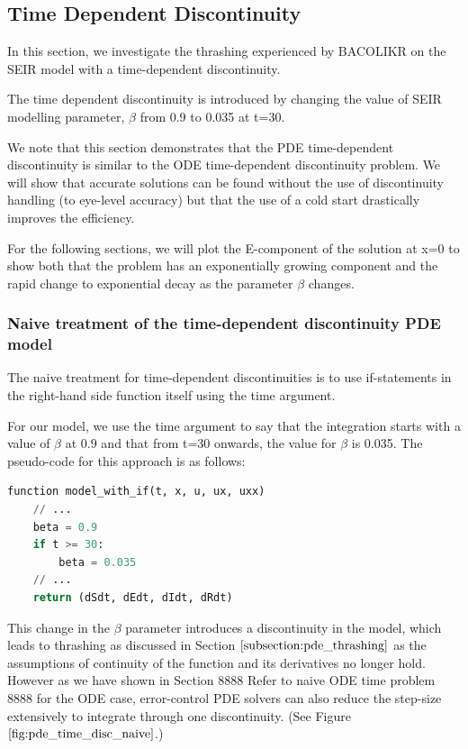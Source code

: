 \documentclass{article}
\begin{document}
\subsection{Time Dependent Discontinuity}
\label{subsection:pde_time_intro}
In this section, we investigate the thrashing experienced by BACOLIKR on the SEIR model with a time-dependent discontinuity. 

The time dependent discontinuity is introduced by changing the value of SEIR modelling parameter, $\beta$ from 0.9 to 0.035 at t=30.

We note that this section demonstrates that the PDE time-dependent discontinuity is similar to the ODE time-dependent discontinuity problem. We will show that accurate solutions can be found without the use of discontinuity handling (to eye-level accuracy) but that the use of a cold start drastically improves the efficiency.

For the following sections, we will plot the E-component of the solution at x=0 to show both that  the problem has an exponentially growing component and the rapid change to exponential decay as the parameter $\beta$ changes.

\subsubsection{Naive treatment of the time-dependent discontinuity PDE model}
\label{subsubsection:pde_time_naive}
The naive treatment for time-dependent discontinuities is to use if-statements in the right-hand side function itself using the time argument.

For our model, we use the time argument to say that the integration starts with a value of $\beta$ at 0.9 and that from t=30 onwards, the value for $\beta$ is 0.035. The pseudo-code for this approach is as follows:

\begin{minipage}{\linewidth}
\begin{lstlisting}[language=Python]
function model_with_if(t, x, u, ux, uxx)
    // ...
    beta = 0.9
    if t >= 30:
        beta = 0.035
    // ...
    return (dSdt, dEdt, dIdt, dRdt)

\end{lstlisting}
\end{minipage}

This change in the $\beta$ parameter introduces a discontinuity in the model, which leads to thrashing as discussed in Section $\ref{subsection:pde_thrashing}$ as the assumptions of continuity of the function and its derivatives no longer hold. However as we have shown in Section 8888 Refer to naive ODE time problem 8888 for the ODE case, error-control PDE solvers can also reduce the step-size extensively to integrate through one discontinuity. (See Figure $\ref{fig:pde_time_disc_naive}$.)
\end{document}
